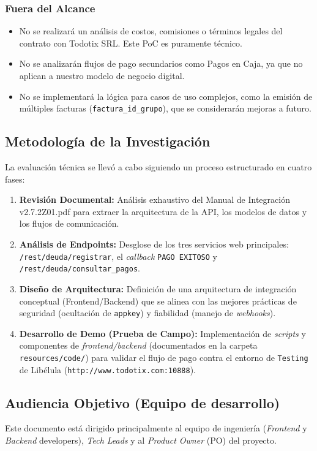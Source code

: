         \subsubsection*{Fuera del Alcance}
            \begin{itemize}
                \item No se realizará un análisis de costos, comisiones o términos legales del contrato con Todotix SRL. Este PoC es puramente técnico.
                \item No se analizarán flujos de pago secundarios como Pagos en Caja, ya que no aplican a nuestro modelo de negocio digital.
                \item No se implementará la lógica para casos de uso complejos, como la emisión de múltiples facturas (\texttt{factura\_id\_grupo}), que se considerarán mejoras a futuro.
            \end{itemize}

    \subsection{Metodología de la Investigación}
        La evaluación técnica se llevó a cabo siguiendo un proceso estructurado en cuatro fases:
        \begin{enumerate}
            \item \textbf{Revisión Documental:} Análisis exhaustivo del Manual de Integración v2.7.2Z01.pdf para extraer la arquitectura de la API, los modelos de datos y los flujos de comunicación.
            \item \textbf{Análisis de Endpoints:} Desglose de los tres servicios web principales: \texttt{/rest/deuda/registrar}, el \emph{callback} \texttt{PAGO EXITOSO} y \texttt{/rest/deuda/consultar\_pagos}.
            \item \textbf{Diseño de Arquitectura:} Definición de una arquitectura de integración conceptual (Frontend/Backend) que se alinea con las mejores prácticas de seguridad (ocultación de \texttt{appkey}) y fiabilidad (manejo de \emph{webhooks}).
            \item \textbf{Desarrollo de Demo (Prueba de Campo):} Implementación de \emph{scripts} y componentes de \emph{frontend/backend} (documentados en la carpeta \texttt{resources/code/}) para validar el flujo de pago contra el entorno de \texttt{Testing} de Libélula (\texttt{http://www.todotix.com:10888}).
        \end{enumerate}


    \subsection{Audiencia Objetivo (Equipo de desarrollo)}
    Este documento está dirigido principalmente al equipo de ingeniería (\emph{Frontend} y \emph{Backend} developers), 
    \emph{Tech Leads} y al \emph{Product Owner} (PO) del proyecto.

